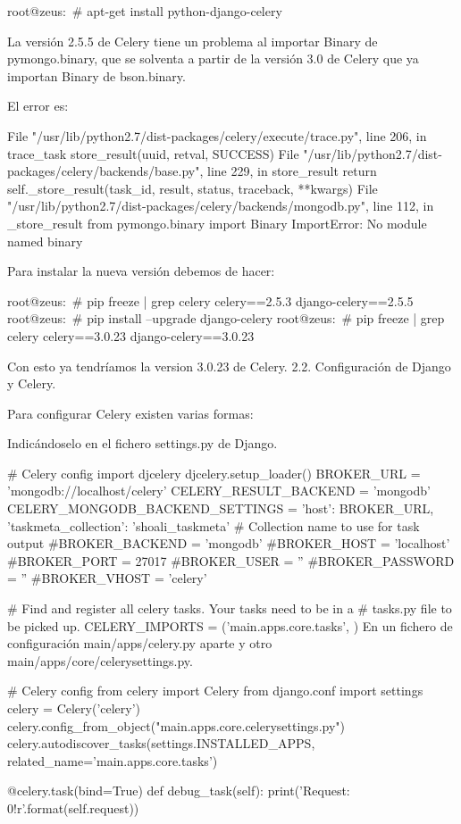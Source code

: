 \documentclass[a4paper, 12pt]{book}
\begin{document}
root@zeus:~# apt-get install python-django-celery

La versión 2.5.5 de Celery tiene un problema al importar Binary de pymongo.binary, que se solventa a partir de la versión 3.0 de Celery que ya importan Binary de bson.binary.

El error es:

File "/usr/lib/python2.7/dist-packages/celery/execute/trace.py", line 206, in trace_task
 store_result(uuid, retval, SUCCESS)
File "/usr/lib/python2.7/dist-packages/celery/backends/base.py", line 229, in store_result
 return self._store_result(task_id, result, status, traceback, **kwargs)
File "/usr/lib/python2.7/dist-packages/celery/backends/mongodb.py", line 112, in _store_result
 from pymongo.binary import Binary
 ImportError: No module named binary

Para instalar la nueva versión debemos de hacer:

root@zeus:~# pip freeze | grep celery
celery==2.5.3
django-celery==2.5.5
root@zeus:~# pip install --upgrade django-celery
root@zeus:~# pip freeze | grep celery
celery==3.0.23
django-celery==3.0.23

Con esto ya tendríamos la version 3.0.23 de Celery.
2.2. Configuración de Django y Celery.

Para configurar Celery existen varias formas:

    Indicándoselo en el fichero settings.py de Django. 

# Celery config
import djcelery
djcelery.setup_loader()
BROKER_URL = 'mongodb://localhost/celery'
CELERY_RESULT_BACKEND = 'mongodb'
CELERY_MONGODB_BACKEND_SETTINGS = {
    'host': BROKER_URL,
    'taskmeta_collection': 'shoali_taskmeta' # Collection name to use for task output
}
#BROKER_BACKEND = 'mongodb'
#BROKER_HOST = 'localhost'
#BROKER_PORT = 27017
#BROKER_USER = ''
#BROKER_PASSWORD = ''
#BROKER_VHOST = 'celery'
 
# Find and register all celery tasks.  Your tasks need to be in a
# tasks.py file to be picked up.
CELERY_IMPORTS = ('main.apps.core.tasks', )
En un fichero de configuración main/apps/celery.py aparte y otro main/apps/core/celerysettings.py. 

# Celery config
from celery import Celery
from django.conf import settings
celery = Celery('celery')
celery.config_from_object("main.apps.core.celerysettings.py")
celery.autodiscover_tasks(settings.INSTALLED_APPS, related_name='main.apps.core.tasks')
 
@celery.task(bind=True)
def debug_task(self):
    print('Request: {0!r}'.format(self.request))
\end{document}
